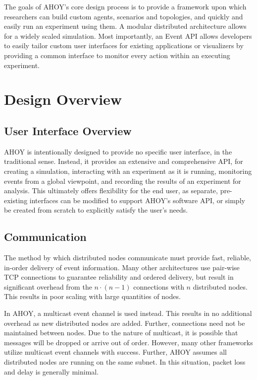 \documentclass[conference]{IEEEtran}
\begin{document}
The goals of AHOY's core design process is to provide a framework upon which researchers can build custom agents, scenarios and topologies, and quickly and easily run an experiment using them. A modular distributed architecture allows for a widely scaled simulation. Most importantly, an Event API allows developers to easily tailor custom user interfaces for existing applications or visualizers by providing a common interface to monitor every action within an executing experiment.

\section{Design Overview}\label{sec:background}
\subsection{User Interface Overview}
AHOY is intentionally designed to provide no specific user interface, in the traditional sense. Instead, it provides an extensive and comprehensive API, for creating a simulation, interacting with an experiment as it is running, monitoring events from a global viewpoint, and recording the results of an experiment for analysis. This ultimately offers flexibility for the end user, as separate, pre-existing interfaces can be modified to support AHOY's software API, or simply be created from scratch to explicitly satisfy the user's needs.

\subsection{Communication}
The method by which distributed nodes communicate must provide fast, reliable, in-order delivery of event information. Many other architectures use pair-wise TCP connections to guarantee reliability and ordered delivery, but result in significant overhead from the $n \cdot (n-1)$ connections with $n$ distributed nodes. This results in poor scaling with large quantities of nodes.

In AHOY, a multicast event channel is used instead. This results in no additional overhead as new distributed nodes are added. Further, connections need not be maintained between nodes. Due to the nature of multicast, it is possible that messages will be dropped or arrive out of order. However, many other frameworks utilize multicast event channels with success. Further, AHOY assumes all distributed nodes are running on the same subnet. In this situation, packet loss and delay is generally minimal.
\end{document}
